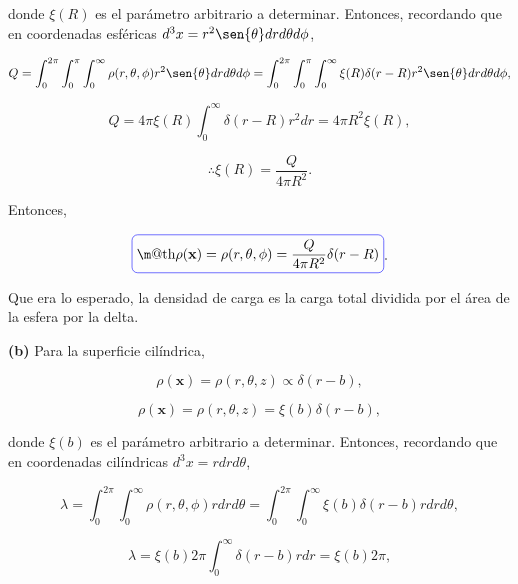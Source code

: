 \documentclass[a4paper,11pt]{article}
\makeatletter
\numberwithin{equation}{section}
\newcommand*{\boxcolor}{blue}
\renewcommand{\boxed}[1]{\textcolor{\boxcolor}{%
\tikz[baseline={([yshift=-1ex]current bounding box.center)}] \node [rectangle, minimum width=1ex,rounded corners,draw] {\normalcolor\m@th$\displaystyle#1$};}}
\makeatother
\begin{document}
donde $\xi(R)$ es el parámetro arbitrario a determinar. Entonces, recordando que 
en coordenadas esféricas $d^3x = r^2\sen{\theta}dr d\theta d\phi$, 

\begin{equation*}
 Q = \int_0^{2\pi} \int_0^\pi \int_0^\infty 
  \rho(r,\theta,\phi) r^2\sen{\theta}dr d\theta d\phi = 
  \int_0^{2\pi} \int_0^\pi \int_0^\infty \xi(R)\delta(r-R)
  r^2\sen{\theta}dr d\theta d\phi,
\end{equation*}

\begin{equation}
 Q = 4\pi\xi(R) \int_0^\infty \delta(r-R) r^2dr = 4\pi R^2 \xi(R),
\end{equation}

\begin{equation}
\therefore \xi(R) = \frac{Q}{4\pi R^2}.
\end{equation}

Entonces, 

\begin{equation}
 \boxed{\rho(\mathbf{x}) =  \rho(r,\theta,\phi) = \frac{Q}{4\pi R^2}\delta(r-R)}.
\end{equation}

\vspace{.3cm}

Que era lo esperado, la densidad de carga es la carga total dividida por el área de
la esfera por la delta.

\vspace{.3cm}

\textbf{(b)} Para la superficie cilíndrica, 

\begin{equation}
 \rho(\mathbf{x}) =  \rho(r,\theta,z) \propto \delta(r - b),
\end{equation}

\begin{equation}
 \rho(\mathbf{x}) =  \rho(r,\theta,z) = \xi(b) \delta(r - b),
\end{equation}

donde $\xi(b)$ es el parámetro arbitrario a determinar. Entonces, recordando que 
en coordenadas cilíndricas $d^3x = rdr d\theta$, 

\begin{equation*}
 \lambda = \int_0^{2\pi} \int_0^\infty 
  \rho(r,\theta,\phi) rdr d\theta = 
  \int_0^{2\pi} \int_0^\infty \xi(b)\delta(r-b)
  r drd\theta,
\end{equation*}

\begin{equation}
 \lambda = \xi(b)2\pi \int_0^\infty \delta(r-b)rdr = \xi(b)2\pi,
\end{equation}
\end{document}
